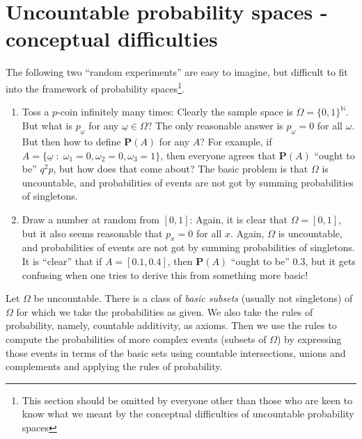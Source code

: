\documentclass[preprint,  11pt]{amsart}
\newcommand{\para}[1]{\vspace{4mm}\noindent{\bfseries #1:}}
\theoremstyle{plain} %
\theoremstyle{definition} %
\begin{document}
{\color{magenta}
\section{Uncountable probability spaces - conceptual difficulties}
The following two ``random experiments'' are easy to imagine, but difficult to fit into the framework of probability spaces\footnote{This section should be omitted by everyone other than those who are keen to know what we meant by the conceptual difficulties of uncountable probability spaces}.
\begin{enumerate}\setlength\itemsep{6pt}
\item Toss a $p$-coin infinitely many times: Clearly the sample space is $\Omega=\{0,1\}^{\mathbb{N}}$. But what is $p_{\underline{\omega}}$ for any $\underline{\omega}\in \Omega$? The only reasonable answer is $p_{\underline{\omega}}=0$ for all $\omega$. But then how to define $\mathbf{P}(A)$ for any $A$?   For example, if $A=\{\underline{\omega}{\; : \;} \omega_{1}=0,\omega_{2}=0,\omega_{3}=1\}$, then everyone agrees that $\mathbf{P}(A)$ ``ought to be'' $q^{2}p$, but how does that come about? The basic problem is that $\Omega$ is uncountable, and probabilities of events are not got by summing probabilities of singletons.
\item Draw a number at random from $[0,1]$: Again, it is clear that $\Omega=[0,1]$, but it also seems reasonable that $p_{x}=0$ for all $x$. Again, $\Omega$ is uncountable, and probabilities of events are not got by summing probabilities of singletons. It is ``clear'' that if $A=[0.1,0.4]$, then $\mathbf{P}(A)$ ``ought to be'' $0.3$, but it gets confusing when one tries to derive this from something more basic!
\end{enumerate}

\para{The resolution} Let $\Omega$ be uncountable. There is a class of {\em basic subsets} (usually not singletons) of $\Omega$ for which we take the probabilities as given. We also take the rules of probability, namely, countable additivity, as axioms. Then we use the rules to compute the probabilities of more complex events (subsets of $\Omega$) by expressing those events in terms of the basic sets using countable intersections, unions and complements and applying the rules of probability.

}
\end{document}
